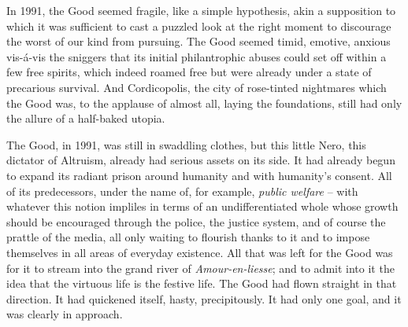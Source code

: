 In 1991, the Good seemed fragile, like a simple hypothesis, akin a supposition to which it was sufficient to cast a puzzled look at the right moment to discourage the worst of our kind from pursuing. The Good seemed timid, emotive, anxious vis-\'a-vis the sniggers that its initial philantrophic abuses could set off within a few free spirits, which indeed roamed free but were already under a state of precarious survival. And Cordicopolis, the city of rose-tinted nightmares which the Good was, to the applause of almost all, laying the foundations, still had only the allure of a half-baked utopia.

The Good, in 1991, was still in swaddling clothes, but this little Nero, this dictator of Altruism, already had serious assets on its side. It had already begun to expand its radiant prison around humanity and with humanity's consent. All of its predecessors, under the name of, for example, \textit{public welfare} -- with whatever this notion impliles in terms of an undifferentiated whole whose growth should be encouraged through the police, the justice system, and of course the prattle of the media, all only waiting to flourish thanks to it and to impose themselves in all areas of everyday existence. All that was left for the Good was for it to stream into the grand river of \textit{Amour-en-liesse}; and to admit into it the idea that the virtuous life is the festive life. The Good had flown straight in that direction. It had quickened itself, hasty, precipitously. It had only one goal, and it was clearly in approach.

